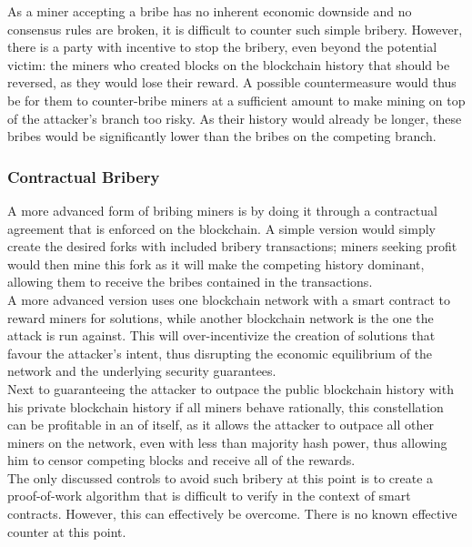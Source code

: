 \documentclass[12pt,a4paper]{article}
\begin{document}
As a miner accepting a bribe has no inherent economic downside and no consensus rules are broken, it is difficult to counter such simple bribery. However, there is a party with incentive to stop the bribery, even beyond the potential victim: the miners who created blocks on the blockchain history that should be reversed, as they would lose their reward. A possible countermeasure would thus be for them to counter-bribe miners at a sufficient amount to make mining on top of the attacker's branch too risky. As their history would already be longer, these bribes would be significantly lower than the bribes on the competing branch.\\

\subsubsection{Contractual Bribery}

A more advanced form of bribing miners is by doing it through a contractual agreement that is enforced on the blockchain. A simple version would simply create the desired forks with included bribery transactions; miners seeking profit would then mine this fork as it will make the competing history dominant, allowing them to receive the bribes contained in the transactions.\\

A more advanced version uses one blockchain network with a smart contract to reward miners for solutions, while another blockchain network is the one the attack is run against. This will over-incentivize the creation of solutions that favour the attacker's intent, thus disrupting the economic equilibrium of the network and the underlying security guarantees.\\

Next to guaranteeing the attacker to outpace the public blockchain history with his private blockchain history if all miners behave rationally, this constellation can be profitable in an of itself, as it allows the attacker to outpace all other miners on the network, even with less than majority hash power, thus allowing him to censor competing blocks and receive all of the rewards.\\

The only discussed controls to avoid such bribery at this point is to create a proof-of-work algorithm that is difficult to verify in the context of smart contracts. However, this can effectively be overcome. There is no known effective counter at this point.\\
\end{document}
